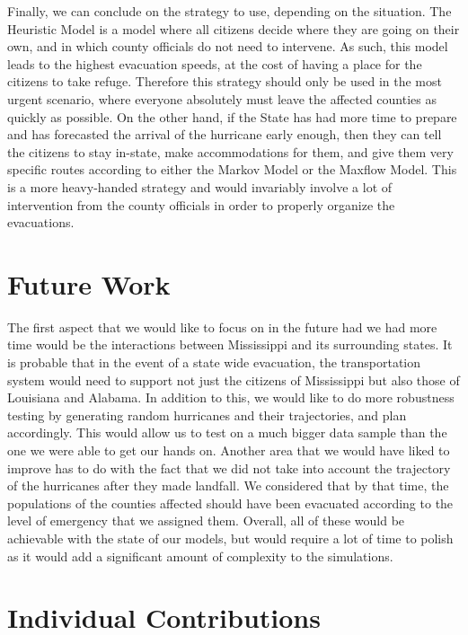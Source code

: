 \documentclass[titlepage]{article}
\begin{document}
\par Finally, we can conclude on the strategy to use, depending on the situation. The Heuristic Model is a model where all citizens decide where they are going on their own, and in which county officials do not need to intervene. As such, this model leads to the highest evacuation speeds, at the cost of having a place for the citizens to take refuge. Therefore this strategy should only be used in the most urgent scenario, where everyone absolutely must leave the affected counties as quickly as possible. On the other hand, if the State has had more time to prepare and has forecasted the arrival of the hurricane early enough, then they can tell the citizens to stay in-state, make accommodations for them, and give them very specific routes according to either the Markov Model or the Maxflow Model. This is a more heavy-handed strategy and would invariably involve a lot of intervention from the county officials in order to properly organize the evacuations.


\section{Future Work}
\label{sec:future}
The first aspect that we would like to focus on in the future had we had more time would be the interactions between Mississippi and its surrounding states. It is probable that in the event of a state wide evacuation, the transportation system would need to support not just the citizens of Mississippi but also those of Louisiana and Alabama.
\newline
In addition to this, we would like to do more robustness testing by generating random hurricanes and their trajectories, and plan accordingly. This would allow us to test on a much bigger data sample than the one we were able to get our hands on.
\newline
Another area that we would have liked to improve has to do with the fact that we did not take into account the trajectory of the hurricanes after they made landfall. We considered that by that time, the populations of the counties affected should have been evacuated according to the level of emergency that we assigned them.\newline
Overall, all of these would be achievable with the state of our models, but would require a lot of time to polish as it would add a significant amount of complexity to the simulations.

\section{Individual Contributions}
\label{sec:contributions}
\end{document}
